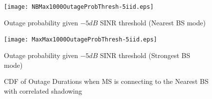 \documentclass[journal,10pt]{IEEEtran}
\begin{document}
 \begin{figure}
 \centering
 \texttt{[image: NBMax1000OutageProbThresh-5iid.eps]}
 \caption{Outage probability given $-5dB$ SINR threshold (Nearest BS mode)}
 \label{fig: outprob1}
 \end{figure}
 \begin{figure}
 \centering
 \texttt{[image: MaxMax1000OutageProbThresh-5iid.eps]}
 \caption{Outage probability given $-5dB$ SINR threshold (Strongest BS mode)}
 \label{fig: outprobs2}
 \end{figure}
 \begin{figure}
 \centering
 \hfil
 \hfil
 \caption{CDF of Outage Durations when MS is connecting to the Nearest BS with correlated shadowing}
 \label{outageduration0}
 \end{figure}
\end{document}

